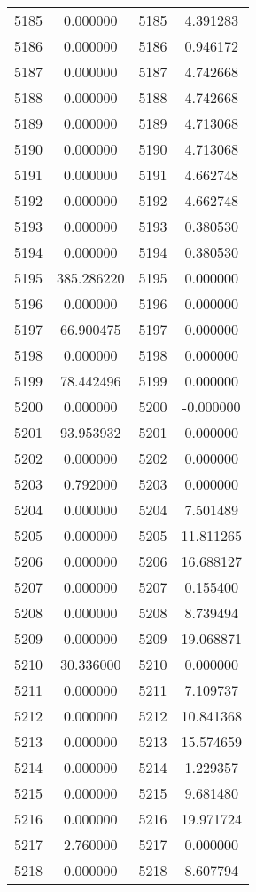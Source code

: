 \documentclass[12pt]{article}
\begin{document}
\begin{longtable}{@{}cccc@{}}
5185 & 0.000000 & 5185 & 4.391283 \\
5186 & 0.000000 & 5186 & 0.946172 \\
5187 & 0.000000 & 5187 & 4.742668 \\
5188 & 0.000000 & 5188 & 4.742668 \\
5189 & 0.000000 & 5189 & 4.713068 \\
5190 & 0.000000 & 5190 & 4.713068 \\
5191 & 0.000000 & 5191 & 4.662748 \\
5192 & 0.000000 & 5192 & 4.662748 \\
5193 & 0.000000 & 5193 & 0.380530 \\
5194 & 0.000000 & 5194 & 0.380530 \\
5195 & 385.286220 & 5195 & 0.000000 \\
5196 & 0.000000 & 5196 & 0.000000 \\
5197 & 66.900475 & 5197 & 0.000000 \\
5198 & 0.000000 & 5198 & 0.000000 \\
5199 & 78.442496 & 5199 & 0.000000 \\
5200 & 0.000000 & 5200 & -0.000000 \\
5201 & 93.953932 & 5201 & 0.000000 \\
5202 & 0.000000 & 5202 & 0.000000 \\
5203 & 0.792000 & 5203 & 0.000000 \\
5204 & 0.000000 & 5204 & 7.501489 \\
5205 & 0.000000 & 5205 & 11.811265 \\
5206 & 0.000000 & 5206 & 16.688127 \\
5207 & 0.000000 & 5207 & 0.155400 \\
5208 & 0.000000 & 5208 & 8.739494 \\
5209 & 0.000000 & 5209 & 19.068871 \\
5210 & 30.336000 & 5210 & 0.000000 \\
5211 & 0.000000 & 5211 & 7.109737 \\
5212 & 0.000000 & 5212 & 10.841368 \\
5213 & 0.000000 & 5213 & 15.574659 \\
5214 & 0.000000 & 5214 & 1.229357 \\
5215 & 0.000000 & 5215 & 9.681480 \\
5216 & 0.000000 & 5216 & 19.971724 \\
5217 & 2.760000 & 5217 & 0.000000 \\
5218 & 0.000000 & 5218 & 8.607794 \\

\end{longtable}
\end{document}
